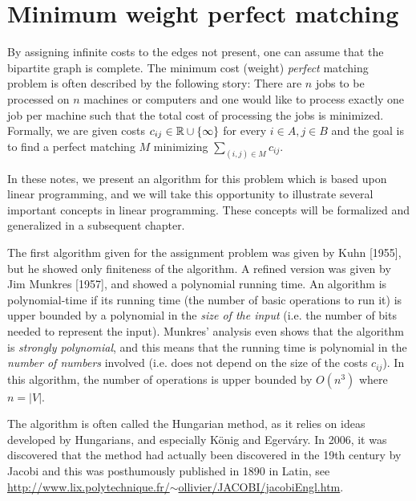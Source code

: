 \documentclass[12pt]{article}
\begin{document}
\section{Minimum weight perfect matching}

By assigning infinite costs to the edges not present, one can assume
that the bipartite graph is complete. The minimum cost (weight) {\it
perfect} matching problem is often described by the following story:
There are $n$ jobs to be processed on $n$ machines or computers and
one would like to process exactly one job per machine such that the
total cost of processing the jobs is minimized. Formally, we are given
costs $c_{ij}\in{\mathbb R}\cup\{\infty\}$ for every $i\in A, j\in B$ and the
goal is to find a perfect matching $M$ minimizing $\sum_{(i,j)\in M}
c_{ij}$.

In these notes, we present an algorithm for this problem which is
based upon linear programming, and we will take this opportunity to
illustrate several important concepts in linear programming. These
concepts will be formalized and generalized in a subsequent chapter. 

The first algorithm given for the assignment problem was given by Kuhn
[1955], but he showed only finiteness of the algorithm. A refined
version was given by Jim Munkres [1957], and showed a polynomial
running time. An algorithm is polynomial-time if its running time (the
number of basic operations to run it) is upper bounded by a polynomial
in the {\it size of the input} (i.e. the number of bits needed to
represent the input). Munkres' analysis even shows that the algorithm
is {\it strongly polynomial}, and this means that the running time is
polynomial in the {\it number of numbers} involved (i.e. does not
depend on the size of the costs $c_{ij}$). In this algorithm, the
number of operations is upper bounded by $O(n^3)$ where $n=|V|$.

The algorithm is often called the Hungarian method, as it relies on
ideas developed by Hungarians, and especially K\"onig and
Egerv\'ary. In 2006, it was discovered that the method had actually
been discovered in the 19th century by Jacobi and this was
posthumously published in 1890 in Latin, see \href{http://www.lix.polytechnique.fr/~ollivier/JACOBI/jacobiEngl.htm}{http://www.lix.polytechnique.fr/$\sim$ollivier/JACOBI/jacobiEngl.htm}.
\end{document}
